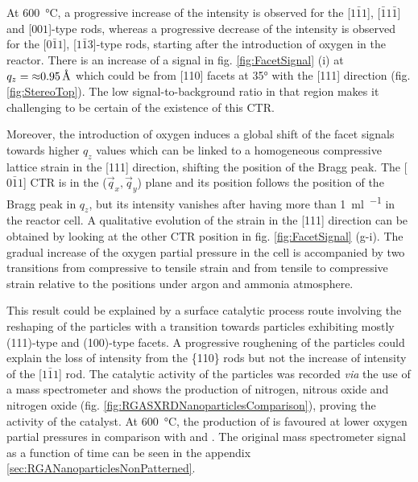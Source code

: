 At \qty{600}{\degreeCelsius}, a progressive increase of the intensity is observed for the [$1\bar{1}1$], [$\bar{1}1\bar{1}$] and [$001$]-type rods, whereas a progressive decrease of the intensity is observed for the [$0\bar{1}1$], [$1\bar{1}3$]-type rods, starting after the introduction of oxygen in the reactor.
There is an increase of a signal in fig. \ref{fig:FacetSignal} (i) at $q_z = \qty{\approx 0.95}{\angstrom}$ which could be from [110] facets at \ang{35} with the [111] direction (fig. \ref{fig:StereoTop}).
The low signal-to-background ratio in that region makes it challenging to be certain of the existence of this CTR.

Moreover, the introduction of oxygen induces a global shift of the facet signals towards higher $q_z$ values which can be linked to a homogeneous compressive lattice strain in the [111] direction, shifting the position of the Bragg peak.
The [$0\bar{1}1$] CTR is in the ($\vec{q}_x, \vec{q}_y$) plane and its position follows the position of the Bragg peak in $q_z$, but its intensity vanishes after having more than \qty{1}{\ml\per\min} in the reactor cell.
A qualitative evolution of the strain in the [111] direction can be obtained by looking at the other CTR position in fig. \ref{fig:FacetSignal} (g-i).
The gradual increase of the oxygen partial pressure in the cell is accompanied by two transitions from compressive to tensile strain and from tensile to compressive strain relative to the positions under argon and ammonia atmosphere.

This result could be explained by a surface catalytic process route involving the reshaping of the particles with a transition towards particles exhibiting mostly (111)-type and (100)-type facets.
A progressive roughening of the particles could explain the loss of intensity from the \{110\} rods but not the increase of intensity of the [$1\bar{1}1$] rod.
The catalytic activity of the particles was recorded \textit{via} the use of a mass spectrometer and shows the production of nitrogen, nitrous oxide and nitrogen oxide (fig. \ref{fig:RGASXRDNanoparticlesComparison}), proving the activity of the catalyst.
At \qty{600}{\degreeCelsius}, the production of \nitrogen is favoured at lower oxygen partial pressures in comparison with \nitrogendioxide and \nitricoxide.
The original mass spectrometer signal as a function of time can be seen in the appendix \ref{sec:RGANanoparticlesNonPatterned}.

